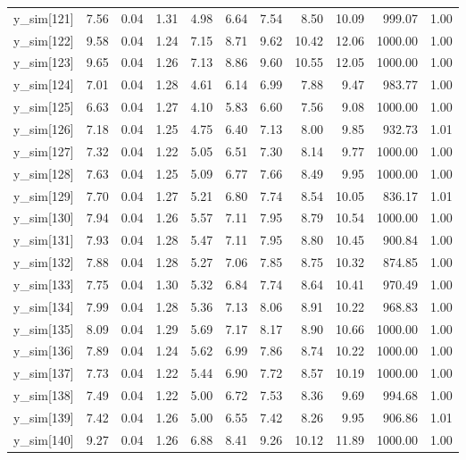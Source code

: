 \begin{table}[ht]
\begin{tabular}{rrrrrrrrrrr}
  y\_sim[121] & 7.56 & 0.04 & 1.31 & 4.98 & 6.64 & 7.54 & 8.50 & 10.09 & 999.07 & 1.00 \\ 
  y\_sim[122] & 9.58 & 0.04 & 1.24 & 7.15 & 8.71 & 9.62 & 10.42 & 12.06 & 1000.00 & 1.00 \\ 
  y\_sim[123] & 9.65 & 0.04 & 1.26 & 7.13 & 8.86 & 9.60 & 10.55 & 12.05 & 1000.00 & 1.00 \\ 
  y\_sim[124] & 7.01 & 0.04 & 1.28 & 4.61 & 6.14 & 6.99 & 7.88 & 9.47 & 983.77 & 1.00 \\ 
  y\_sim[125] & 6.63 & 0.04 & 1.27 & 4.10 & 5.83 & 6.60 & 7.56 & 9.08 & 1000.00 & 1.00 \\ 
  y\_sim[126] & 7.18 & 0.04 & 1.25 & 4.75 & 6.40 & 7.13 & 8.00 & 9.85 & 932.73 & 1.01 \\ 
  y\_sim[127] & 7.32 & 0.04 & 1.22 & 5.05 & 6.51 & 7.30 & 8.14 & 9.77 & 1000.00 & 1.00 \\ 
  y\_sim[128] & 7.63 & 0.04 & 1.25 & 5.09 & 6.77 & 7.66 & 8.49 & 9.95 & 1000.00 & 1.00 \\ 
  y\_sim[129] & 7.70 & 0.04 & 1.27 & 5.21 & 6.80 & 7.74 & 8.54 & 10.05 & 836.17 & 1.01 \\ 
  y\_sim[130] & 7.94 & 0.04 & 1.26 & 5.57 & 7.11 & 7.95 & 8.79 & 10.54 & 1000.00 & 1.00 \\ 
  y\_sim[131] & 7.93 & 0.04 & 1.28 & 5.47 & 7.11 & 7.95 & 8.80 & 10.45 & 900.84 & 1.00 \\ 
  y\_sim[132] & 7.88 & 0.04 & 1.28 & 5.27 & 7.06 & 7.85 & 8.75 & 10.32 & 874.85 & 1.00 \\ 
  y\_sim[133] & 7.75 & 0.04 & 1.30 & 5.32 & 6.84 & 7.74 & 8.64 & 10.41 & 970.49 & 1.00 \\ 
  y\_sim[134] & 7.99 & 0.04 & 1.28 & 5.36 & 7.13 & 8.06 & 8.91 & 10.22 & 968.83 & 1.00 \\ 
  y\_sim[135] & 8.09 & 0.04 & 1.29 & 5.69 & 7.17 & 8.17 & 8.90 & 10.66 & 1000.00 & 1.00 \\ 
  y\_sim[136] & 7.89 & 0.04 & 1.24 & 5.62 & 6.99 & 7.86 & 8.74 & 10.22 & 1000.00 & 1.00 \\ 
  y\_sim[137] & 7.73 & 0.04 & 1.22 & 5.44 & 6.90 & 7.72 & 8.57 & 10.19 & 1000.00 & 1.00 \\ 
  y\_sim[138] & 7.49 & 0.04 & 1.22 & 5.00 & 6.72 & 7.53 & 8.36 & 9.69 & 994.68 & 1.00 \\ 
  y\_sim[139] & 7.42 & 0.04 & 1.26 & 5.00 & 6.55 & 7.42 & 8.26 & 9.95 & 906.86 & 1.01 \\ 
  y\_sim[140] & 9.27 & 0.04 & 1.26 & 6.88 & 8.41 & 9.26 & 10.12 & 11.89 & 1000.00 & 1.00 \\ 

\end{tabular}
\end{table}

